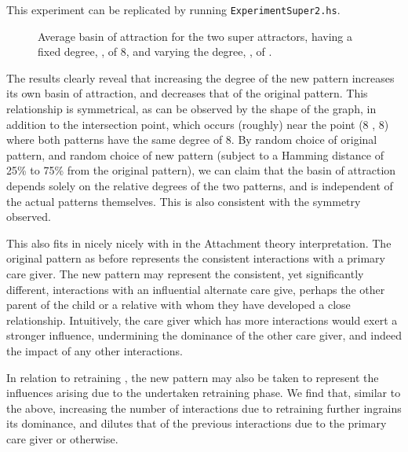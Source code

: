 This experiment can be replicated by running \texttt{ExperimentSuper2.hs}. 

\begin{figure}[h]
  \centering

\caption{Average basin of attraction for the two super attractors, \poriginsuper having a fixed degree, \dorigin, of 8, and varying the degree, \dnew, of \pnewsuper.}
\label{fig:two super plot}
\end{figure}


The results clearly reveal that increasing the degree of the new pattern increases its own basin of attraction, and decreases that of the original pattern. This relationship is symmetrical, as can be observed by the shape of the graph, in addition to the intersection point, which occurs (roughly) near the point (8 , 8) where both patterns have the same degree of 8. By random choice of original pattern, and random choice of new pattern (subject to a Hamming distance of 25\% to 75\% from the original pattern), we can claim that the basin of attraction depends solely on the relative degrees of the two patterns, and is independent of the actual patterns themselves. This is also consistent with the symmetry observed.

This also fits in nicely nicely with in the Attachment theory interpretation. The original pattern as before represents the consistent interactions with a primary care giver. The new pattern may represent the consistent, yet significantly different, interactions with an influential alternate care give, perhaps the other parent of the child or a relative with whom they have developed a close relationship. Intuitively, the care giver which has more interactions would exert a stronger influence, undermining the dominance of the other care giver, and indeed the impact of any other interactions.

In relation to retraining , the new pattern may also be taken to represent the influences arising due to the undertaken retraining phase. We find that, similar to the above, increasing the number of interactions due to retraining further ingrains its dominance, and dilutes that of the previous interactions due to the primary care giver or otherwise.


\let\psuper\undefined
\let\poriginsuper\undefined
\let\pnewsuper\undefined
\let\dorigin\undefined
\let\dnew\undefined
\let\prandom\undefined







